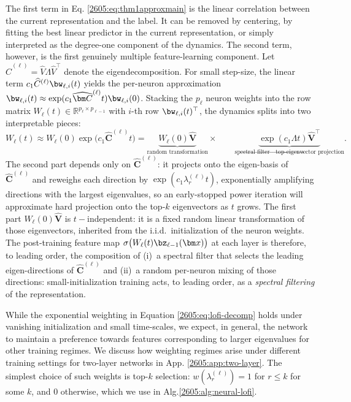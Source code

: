 The first term in Eq. \ref{2605:eq:thm1approxmain} is the linear correlation between the current representation and the label. It can be removed by centering, by fitting the best linear predictor in the current representation, or simply interpreted as the degree-one component of the dynamics. The second term, however, is the first genuinely multiple feature-learning component. Let $\widehat{C}^{(\ell)}=\hat{V}\Lambda\hat{V}^\top$ denote the eigendecomposition. For small step-size, the linear term $c_1\widehat{C}^{(\ell)} \bw_{\ell,i}(t)$ yields the per-neuron approximation $\bw_{\ell,i}(t)\approx \exp(c_1 \widehat{\bm C}^{(\ell)} t) \bw_{\ell,i}(0)$. Stacking the $p_\ell$ neuron weights into the row matrix $W_\ell(t)\in\mathbb{R}^{p_\ell\times p_{\ell-1}}$ with $i$-th row $\bw_{\ell,i}(t)^\top$, the dynamics splits into two interpretable pieces:
\begin{equation}\label{2605:eq:lofi-decomp}
    W_\ell(t)
     \approx 
    W_\ell(0) \exp \bigl(c_1 \widehat{\bm C}^{(\ell)} t\bigr)
     = 
    \underbrace{W_\ell(0) \hat{\bm V}}_{\text{random transformation}} \times \qquad \underbrace{\exp(c_1 \Lambda t) \hat{\bm V}^{ \top}}_{\text{spectral filter} \to \text{top-eigenvector projection}} .
\end{equation}
The second part depends only on $\widehat{\bm C}^{(\ell)}$: it projects onto the eigen-basis of $\widehat{\bm C}^{(\ell)}$ and reweighs each direction by $\exp(c_1\lambda_r^{(\ell)} t)$, exponentially amplifying directions with the largest eigenvalues, so an early-stopped power iteration will approximate hard projection onto the top-$k$ eigenvectors as $t$ grows. The first part $W_\ell(0) \hat{\bm V}$ is $t-$independent: it is a fixed random linear transformation of those eigenvectors, inherited from the i.i.d.\ initialization of the neuron weights. 
The post-training feature map $\sigma\bigl(W_\ell(t) \bz_{\ell-1}(\bm x)\bigr)$ at each layer is therefore, to leading order, the composition of (i)~a spectral filter that selects the leading eigen-directions of $\widehat{\bm C}^{(\ell)}$ and (ii)~a random per-neuron mixing of those directions: small-initialization training acts, to leading order, as a {\it spectral filtering} of the  representation. 


While the exponential weighting in Equation \ref{2605:eq:lofi-decomp} holds under vanishing initialization and small time-scales, we expect, in general, the network to maintain a preference towards features corresponding to larger eigenvalues for other training regimes. We discuss how weighting regimes arise under different training settings for two-layer networks in App. \ref{2605:app:two-layer}. The simplest choice of such weights is top-$k$ selection: $w(\lambda_r^{(\ell)})=1$ for $r\leq k$ for some $k$, and $0$ otherwise, which we use in Alg.\ref{2605:alg:neural-lofi}. 

